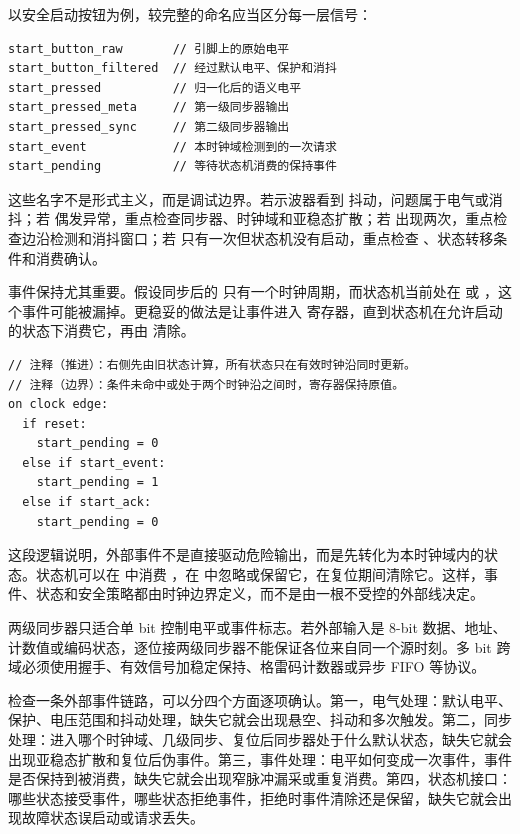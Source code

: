 以安全启动按钮为例，较完整的命名应当区分每一层信号：

\begin{lstlisting}
start_button_raw       // 引脚上的原始电平
start_button_filtered  // 经过默认电平、保护和消抖
start_pressed          // 归一化后的语义电平
start_pressed_meta     // 第一级同步器输出
start_pressed_sync     // 第二级同步器输出
start_event            // 本时钟域检测到的一次请求
start_pending          // 等待状态机消费的保持事件
\end{lstlisting}

这些名字不是形式主义，而是调试边界。若示波器看到  抖动，问题属于电气或消抖；若  偶发异常，重点检查同步器、时钟域和亚稳态扩散；若  出现两次，重点检查边沿检测和消抖窗口；若  只有一次但状态机没有启动，重点检查 、状态转移条件和消费确认。

事件保持尤其重要。假设同步后的  只有一个时钟周期，而状态机当前处在  或 ，这个事件可能被漏掉。更稳妥的做法是让事件进入  寄存器，直到状态机在允许启动的状态下消费它，再由  清除。

\begin{lstlisting}
// 注释（推进）：右侧先由旧状态计算，所有状态只在有效时钟沿同时更新。
// 注释（边界）：条件未命中或处于两个时钟沿之间时，寄存器保持原值。
on clock edge:
  if reset:
    start_pending = 0
  else if start_event:
    start_pending = 1
  else if start_ack:
    start_pending = 0
\end{lstlisting}

这段逻辑说明，外部事件不是直接驱动危险输出，而是先转化为本时钟域内的状态。状态机可以在  中消费 ，在  中忽略或保留它，在复位期间清除它。这样，事件、状态和安全策略都由时钟边界定义，而不是由一根不受控的外部线决定。

\begin{warningbox}
两级同步器只适合单 bit 控制电平或事件标志。若外部输入是 8-bit 数据、地址、计数值或编码状态，逐位接两级同步器不能保证各位来自同一个源时刻。多 bit 跨域必须使用握手、有效信号加稳定保持、格雷码计数器或异步 FIFO 等协议。
\end{warningbox}

检查一条外部事件链路，可以分四个方面逐项确认。第一，电气处理：默认电平、保护、电压范围和抖动处理，缺失它就会出现悬空、抖动和多次触发。第二，同步处理：进入哪个时钟域、几级同步、复位后同步器处于什么默认状态，缺失它就会出现亚稳态扩散和复位后伪事件。第三，事件处理：电平如何变成一次事件，事件是否保持到被消费，缺失它就会出现窄脉冲漏采或重复消费。第四，状态机接口：哪些状态接受事件，哪些状态拒绝事件，拒绝时事件清除还是保留，缺失它就会出现故障状态误启动或请求丢失。

